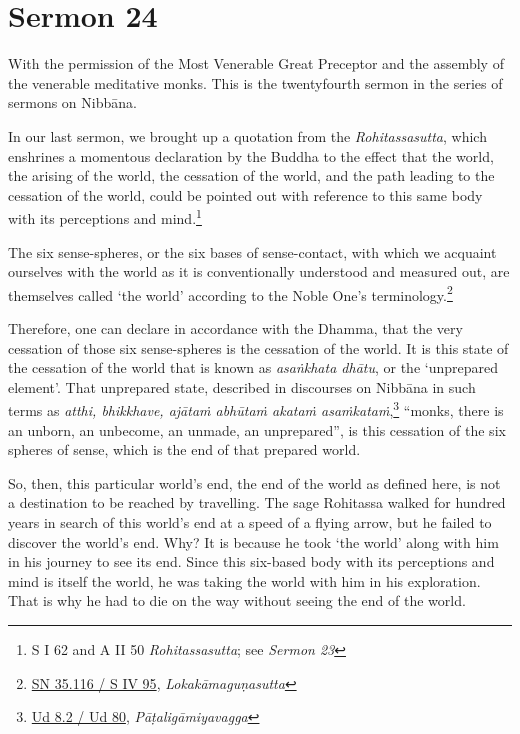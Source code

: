 \chapter{Sermon 24}

\NibbanaOpeningQuote

With the permission of the Most Venerable Great Preceptor and the assembly of the venerable meditative monks. This is the twentyfourth sermon in the series of sermons on Nibbāna.

In our last sermon, we brought up a quotation from the \emph{Rohitassasutta}, which enshrines a momentous declaration by the Buddha to the effect that the world, the arising of the world, the cessation of the world, and the path leading to the cessation of the world, could be pointed out with reference to this same body with its perceptions and mind.\footnote{S I 62 and A II 50 \emph{Rohitassasutta}; see \emph{Sermon 23}}

The six sense-spheres, or the six bases of sense-contact, with which we acquaint ourselves with the world as it is conventionally understood and measured out, are themselves called `the world' according to the Noble One's terminology.\footnote{\href{https://suttacentral.net/sn35.116/pli/ms}{SN 35.116 / S IV 95}, \emph{Lokakāmaguṇasutta}}

Therefore, one can declare in accordance with the Dhamma, that the very cessation of those six sense-spheres is the cessation of the world. It is this state of the cessation of the world that is known as \emph{asaṅkhata dhātu}, or the `unprepared element'. That unprepared state, described in discourses on Nibbāna in such terms as \emph{atthi, bhikkhave, ajātaṁ abhūtaṁ akataṁ asaṁkataṁ},\footnote{\href{https://suttacentral.net/ud8.2/pli/ms}{Ud 8.2 / Ud 80}, \emph{Pāṭaligāmiyavagga}} ``monks, there is an unborn, an unbecome, an unmade, an unprepared'', is this cessation of the six spheres of sense, which is the end of that prepared world.

So, then, this particular world's end, the end of the world as defined here, is not a destination to be reached by travelling. The sage Rohitassa walked for hundred years in search of this world's end at a speed of a flying arrow, but he failed to discover the world's end. Why? It is because he took `the world' along with him in his journey to see its end. Since this six-based body with its perceptions and mind is itself the world, he was taking the world with him in his exploration. That is why he had to die on the way without seeing the end of the world.

